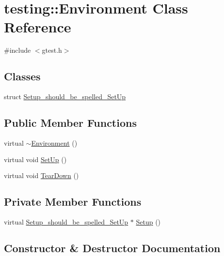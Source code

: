 \hypertarget{classtesting_1_1Environment}{}\section{testing\+:\+:Environment Class Reference}
\label{classtesting_1_1Environment}


{\ttfamily \#include $<$gtest.\+h$>$}

\subsection*{Classes}
\begin{DoxyCompactItemize}
\item 
struct \hyperlink{structtesting_1_1Environment_1_1Setup__should__be__spelled__SetUp}{Setup\+\_\+should\+\_\+be\+\_\+spelled\+\_\+\+Set\+Up}
\end{DoxyCompactItemize}
\subsection*{Public Member Functions}
\begin{DoxyCompactItemize}
\item 
virtual \hyperlink{classtesting_1_1Environment_a0e41c320362576d752cd1f44cabd57d4}{$\sim$\+Environment} ()
\item 
virtual void \hyperlink{classtesting_1_1Environment_a1bf8cafaa9d4eba9feb98655ee434eb3}{Set\+Up} ()
\item 
virtual void \hyperlink{classtesting_1_1Environment_a039bdaa705c46b9b88234cf4d3bb6254}{Tear\+Down} ()
\end{DoxyCompactItemize}
\subsection*{Private Member Functions}
\begin{DoxyCompactItemize}
\item 
virtual \hyperlink{structtesting_1_1Environment_1_1Setup__should__be__spelled__SetUp}{Setup\+\_\+should\+\_\+be\+\_\+spelled\+\_\+\+Set\+Up} $\ast$ \hyperlink{classtesting_1_1Environment_a6096a69b03f6eb727a69a39f854cc87b}{Setup} ()
\end{DoxyCompactItemize}


\subsection{Constructor \& Destructor Documentation}
\mbox{\label{classtesting_1_1Environment_a0e41c320362576d752cd1f44cabd57d4}} 
